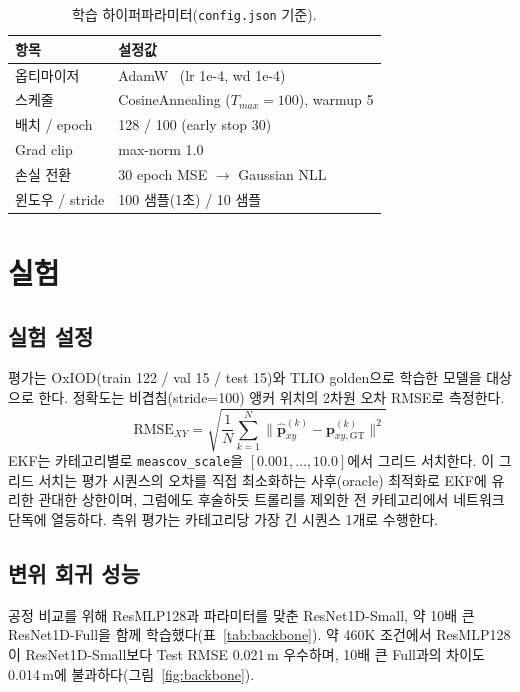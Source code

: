 \documentclass[10pt,twocolumn,a4paper]{article}
\begin{document}
\begin{table}[t]
\caption{학습 하이퍼파라미터(\texttt{config.json} 기준).}
\label{tab:hyper}
\centering\footnotesize
\begin{tabular}{@{}p{}p{}@{}}
\toprule
항목 & 설정값 \\ \midrule
옵티마이저 & AdamW~\cite{adamw} (lr 1e-4, wd 1e-4) \\
스케줄 & CosineAnnealing ($T_{max}{=}100$), warmup 5 \\
배치 / epoch & 128 / 100 (early stop 30) \\
Grad clip & max-norm 1.0 \\
손실 전환 & 30 epoch MSE $\to$ Gaussian NLL \\
윈도우 / stride & 100 샘플(1초) / 10 샘플 \\ \bottomrule
\end{tabular}
\end{table}

\section{실험}
\subsection{실험 설정}
평가는 OxIOD(train 122 / val 15 / test 15)와 TLIO golden으로 학습한 모델을 대상으로 한다. 정확도는 비겹침(stride=100) 앵커 위치의 2차원 오차 RMSE로 측정한다.
\begin{equation}
\mathrm{RMSE}_{XY}=\sqrt{\frac{1}{N}\sum_{k=1}^{N}\lVert\hat{\mathbf{p}}^{(k)}_{xy}-\mathbf{p}^{(k)}_{xy,\mathrm{GT}}\rVert^2}
\end{equation}
EKF는 카테고리별로 \texttt{meascov\_scale}을 $[0.001,\ldots,10.0]$에서 그리드 서치한다. 이 그리드 서치는 평가 시퀀스의 오차를 직접 최소화하는 사후(oracle) 최적화로 EKF에 유리한 관대한 상한이며, 그럼에도 후술하듯 트롤리를 제외한 전 카테고리에서 네트워크 단독에 열등하다. 측위 평가는 카테고리당 가장 긴 시퀀스 1개로 수행한다.

\subsection{변위 회귀 성능}
공정 비교를 위해 ResMLP128과 파라미터를 맞춘 ResNet1D-Small, 약 10배 큰 ResNet1D-Full을 함께 학습했다(표~\ref{tab:backbone}). 약 460K 조건에서 ResMLP128이 ResNet1D-Small보다 Test RMSE 0.021\,m 우수하며, 10배 큰 Full과의 차이도 0.014\,m에 불과하다(그림~\ref{fig:backbone}).
\end{document}
